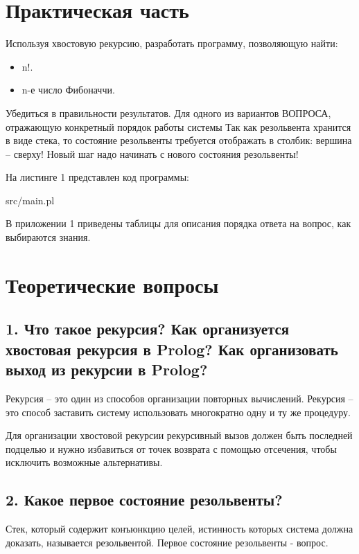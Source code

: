 \chapter*{Практическая часть}

Используя хвостовую рекурсию, разработать программу, позволяющую найти:
\begin{itemize}
	\item n!.
	\item n-е число Фибоначчи.
\end{itemize}

Убедиться в правильности результатов.
Для одного из вариантов ВОПРОСА, отражающую конкретный порядок работы системы
Так как резольвента хранится в виде стека, то состояние резольвенты требуется отображать в столбик: вершина – сверху! Новый шаг надо начинать с нового состояния резольвенты!

На листинге 1 представлен код программы:

\FloatBarrier
\begin{lstinputlisting}[style={lsp}]{src/main.pl}
\end{lstinputlisting}
\FloatBarrier

В приложении 1 приведены таблицы для описания порядка ответа на вопрос, как выбираются знания.

\chapter*{Теоретические вопросы}

\section*{1. Что такое рекурсия? Как организуется хвостовая рекурсия в Prolog? Как организовать выход из рекурсии в Prolog?}
Рекурсия – это один из способов организации повторных вычислений. Рекурсия – это способ заставить систему использовать многократно одну и ту же процедуру.

Для организации хвостовой рекурсии рекурсивный вызов должен быть последней подцелью и нужно избавиться от точек возврата с помощью отсечения, чтобы исключить возможные альтернативы.

\section*{2. Какое первое состояние резольвенты?}
Стек, который содержит конъюнкцию целей, истинность которых система должна доказать, называется
резольвентой. Первое состояние резольвенты - вопрос.

